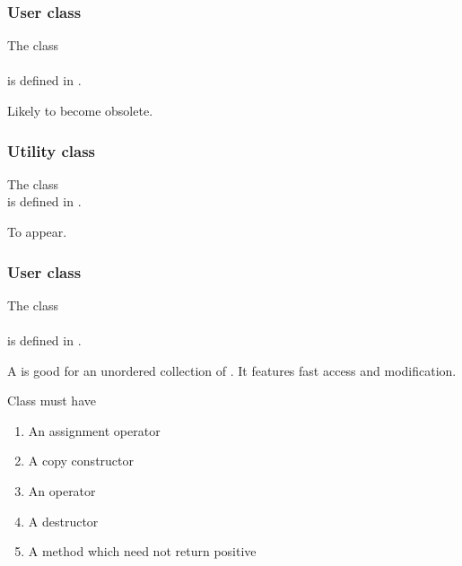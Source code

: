 \subsubsection{User class }


\noindent The class\\
\\
is defined in .



Likely to become obsolete.


\subsubsection{Utility class }


\noindent The class \\
is defined in .



To appear.


\subsubsection{User class }


\noindent The class\\
\\
is defined in .

\noindent A  is good for an unordered collection of .
It features fast access and modification.



\noindent Class  must have

\begin{enumerate}
\item
An assignment operator
\item
A copy constructor
\item
An \code{==} operator
\item
A destructor
\item
A method  which need not return positive 
\end{enumerate}

